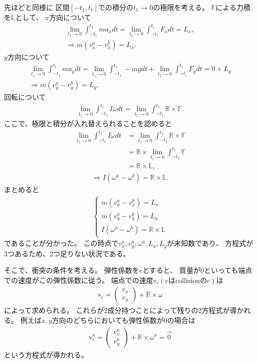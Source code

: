 \documentclass[a4paper,11pt]{jsarticle}
\begin{document}
先ほどと同様に
区間$[-t_1, t_1]$での積分の$t_1\rightarrow 0$の極限を考える。
$\mathbb{F}$による力積を$\mathbb{L}$として、
$x$方向について
\begin{gather*}
  \lim_{t_1 \rightarrow 0}\int_{-t_1}^{t_1} m a_x dt = \lim_{t_1 \rightarrow 0}\int_{-t_1}^{t_1} F_x dt = L_x,
  \\
  \Rightarrow
  m (v_x^a - v_x^b) = L_x.
\end{gather*}
$y$方向について
\begin{gather*}
  \lim_{t_1 \rightarrow 0}\int_{-t_1}^{t_1} m a_y dt
  = \lim_{t_1 \rightarrow 0}\int_{-t_1}^{t_1} -mg dt 
  + \lim_{t_1 \rightarrow 0}\int_{-t_1}^{t_1} F_y dt = 0 + L_y
  \\
  \Rightarrow
  m (v_y^a - v_y^b) = L_y.
\end{gather*}
回転について
\begin{align*}
  \lim_{t_1 \rightarrow 0} \int_{-t_1}^{t_1} I\dot\omega dt
  = \lim_{t_1 \rightarrow 0} \int_{-t_1}^{t_1} \mathbb{R} \times \mathbb{F}.
\end{align*}
ここで、極限と積分が入れ替えられることを認めると
\begin{align*}
  \lim_{t_1 \rightarrow 0} \int_{-t_1}^{t_1} I\dot\omega dt
  &= \lim_{t_1 \rightarrow 0} \int_{-t_1}^{t_1} \mathbb{R} \times \mathbb{F}
  \\ &= \mathbb{R} \times \lim_{t_1 \rightarrow 0} \int_{-t_1}^{t_1} \mathbb{F}
  \\ &= \mathbb{R} \times \mathbb{L},
\end{align*}
\begin{gather*}
  \Rightarrow
  I (\omega^a - \omega^b) = \mathbb{R} \times \mathbb{L}.
\end{gather*}
まとめると
\begin{gather*}
  \begin{cases}
    m (v_x^a - v_x^b) = L_x
    \\
    m (v_y^a - v_y^b) = L_y
    \\
    I (\omega^a - \omega^b) = \mathbb{R} \times \mathbb{L}
  \end{cases}
\end{gather*}
であることが分かった。
この時点で$v_x^a, v_y^a, \omega^a, L_x, L_y$が未知数であり、
方程式が3つあるため、2つ足りない状況である。

そこで、衝突の条件を考える。
弾性係数を$e$とすると、
質量が0といっても端点での速度がこの弾性係数に従う。
端点での速度$\mathbb{v}_c (\text{cはcollisionのc})$は
\begin{gather}
  \mathbb{v}_c = \begin{pmatrix}
    v_x
    \\
    v_y
  \end{pmatrix} + \mathbb{R} \times \omega
\end{gather}
によって求められる。
これらが2成分持つことによって残りの2方程式が導かれる。
例えば$x,y$方向のどちらにおいても弾性係数が0の場合は
\begin{gather*}
  \mathbb{v}_c^a = \begin{pmatrix}
    v_x^a
    \\
    v_y^a
  \end{pmatrix} + \mathbb{R} \times \omega^a = \vec{0}
\end{gather*}
という方程式が導かれる。
\end{document}
